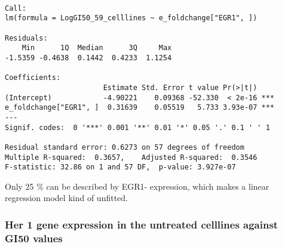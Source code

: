 \documentclass[]{article}
\begin{document}
\begin{verbatim}

Call:
lm(formula = LogGI50_59_celllines ~ e_foldchange["EGR1", ])

Residuals:
    Min      1Q  Median      3Q     Max 
-1.5359 -0.4638  0.1442  0.4233  1.1254 

Coefficients:
                       Estimate Std. Error t value Pr(>|t|)    
(Intercept)            -4.90221    0.09368 -52.330  < 2e-16 ***
e_foldchange["EGR1", ]  0.31639    0.05519   5.733 3.93e-07 ***
---
Signif. codes:  0 '***' 0.001 '**' 0.01 '*' 0.05 '.' 0.1 ' ' 1

Residual standard error: 0.6273 on 57 degrees of freedom
Multiple R-squared:  0.3657,    Adjusted R-squared:  0.3546 
F-statistic: 32.86 on 1 and 57 DF,  p-value: 3.927e-07
\end{verbatim}

Only 25 \% can be described by EGR1- expression, which makes a linear
regression model kind of unfitted.

\hypertarget{her-1-gene-expression-in-the-untreated-celllines-against-gi50-values}{%
\subsubsection{Her 1 gene expression in the untreated celllines against
GI50
values}\label{her-1-gene-expression-in-the-untreated-celllines-against-gi50-values}}
\end{document}
